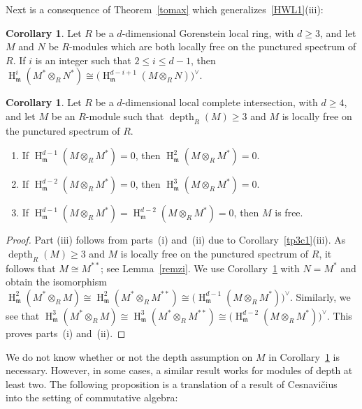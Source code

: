 \documentclass[11pt]{amsart}
\theoremstyle{definition}
\newtheorem{cor}[thm]{Corollary}
\theoremstyle{definition}
\numberwithin{equation}{section}
\newcommand{\fm}{\mathfrak{m}}
\DeclareMathOperator{\depth}{depth}
\DeclareMathOperator{\hh}{H}
\begin{document}
Next is a consequence of Theorem~\ref{tomax} which generalizes~\ref{HWL1}(iii):

\begin{cor} \label{HWL3cor} Let $R$ be a $d$-dimensional Gorenstein local ring, with $d\geq 3$, and let $M$ and $N$ be $R$-modules which are both locally free on the punctured spectrum of $R$. If $i$ is an integer such that $2 \leq i \leq d-1$, then $\hh_{\fm}^i(M^\ast\otimes_RN^\ast)\cong \big(\hh_{\fm}^{d-i+1}(M \otimes_RN )\big)^{\vee}$.
\end{cor}

\begin{cor} \label{depthcor} Let $R$ be a $d$-dimensional local complete intersection, with $d\geq 4$, and let $M$ be an $R$-module such that $\depth_R(M)\geq 3$ and $M$ is locally free on the punctured spectrum of $R$. 
\begin{enumerate}[\rm(i)]
\item If $\hh^{d-1}_{\fm}(M\otimes_RM^{\ast})=0$, then $\hh^{2}_{\fm}(M\otimes_RM^{\ast})=0$.
\item If $\hh^{d-2}_{\fm}(M\otimes_RM^{\ast})=0$, then $\hh^{3}_{\fm}(M\otimes_RM^{\ast})=0$.
\item If $\hh^{d-1}_{\fm}(M\otimes_RM^{\ast})=\hh^{d-2}_{\fm}(M\otimes_RM^{\ast})=0$, then $M$ is free.
\end{enumerate}
\end{cor}

\begin{proof} Part (iii) follows from parts~(i) and~(ii) due to Corollary~\ref{tp3c1}(iii). As $\depth_R(M)\geq 3$ and $M$ is locally free on the punctured spectrum of $R$, it follows that $M\cong M^{\ast\ast}$; see Lemma~\ref{remzi}. We use Corollary~\ref{HWL3cor} with $N=M^{\ast}$ and obtain the isomorphism $\hh_{\fm}^{2}(M^\ast\otimes_RM) \cong \hh_{\fm}^{2}(M^\ast\otimes_RM^{\ast\ast})  \cong \big(\hh_{\fm}^{d-1}(M \otimes_RM^{\ast} )\big)^{\vee}$. Similarly, we see that $ \hh_{\fm}^{3}(M^\ast\otimes_RM) \cong \hh_{\fm}^{3}(M^\ast\otimes_RM^{\ast\ast})  \cong \big(\hh_{\fm}^{d-2}(M \otimes_RM^{\ast} )\big)^{\vee}$. This proves parts~(i) and~(ii). 
\end{proof}

We do not know whether or not the depth assumption on $M$ in Corollary~\ref{depthcor} is necessary. However, in some cases, a similar result works for modules of depth at least two. The following proposition is a translation of a result of {C}esnavi\v{c}ius~\cite{KC} into the setting of commutative algebra:
\end{document}
